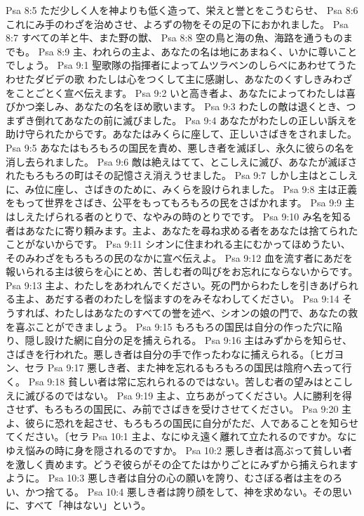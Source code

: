 Psa 8:5  ただ少しく人を神よりも低く造って、栄えと誉とをこうむらせ、
Psa 8:6  これにみ手のわざを治めさせ、よろずの物をその足の下におかれました。
Psa 8:7  すべての羊と牛、また野の獣、
Psa 8:8  空の鳥と海の魚、海路を通うものまでも。
Psa 8:9  主、われらの主よ、あなたの名は地にあまねく、いかに尊いことでしょう。
Psa 9:1  聖歌隊の指揮者によってムツラベンのしらべにあわせてうたわせたダビデの歌 わたしは心をつくして主に感謝し、あなたのくすしきみわざをことごとく宣べ伝えます。
Psa 9:2  いと高き者よ、あなたによってわたしは喜びかつ楽しみ、あなたの名をほめ歌います。
Psa 9:3  わたしの敵は退くとき、つまずき倒れてあなたの前に滅びました。
Psa 9:4  あなたがわたしの正しい訴えを助け守られたからです。あなたはみくらに座して、正しいさばきをされました。
Psa 9:5  あなたはもろもろの国民を責め、悪しき者を滅ぼし、永久に彼らの名を消し去られました。
Psa 9:6  敵は絶えはてて、とこしえに滅び、あなたが滅ぼされたもろもろの町はその記憶さえ消えうせました。
Psa 9:7  しかし主はとこしえに、み位に座し、さばきのために、みくらを設けられました。
Psa 9:8  主は正義をもって世界をさばき、公平をもってもろもろの民をさばかれます。
Psa 9:9  主はしえたげられる者のとりで、なやみの時のとりでです。
Psa 9:10  み名を知る者はあなたに寄り頼みます。主よ、あなたを尋ね求める者をあなたは捨てられたことがないからです。
Psa 9:11  シオンに住まわれる主にむかってほめうたい、そのみわざをもろもろの民のなかに宣べ伝えよ。
Psa 9:12  血を流す者にあだを報いられる主は彼らを心にとめ、苦しむ者の叫びをお忘れにならないからです。
Psa 9:13  主よ、わたしをあわれんでください。死の門からわたしを引きあげられる主よ、あだする者のわたしを悩ますのをみそなわしてください。
Psa 9:14  そうすれば、わたしはあなたのすべての誉を述べ、シオンの娘の門で、あなたの救を喜ぶことができましょう。
Psa 9:15  もろもろの国民は自分の作った穴に陥り、隠し設けた網に自分の足を捕えられる。
Psa 9:16  主はみずからを知らせ、さばきを行われた。悪しき者は自分の手で作ったわなに捕えられる。〔ヒガヨン、セラ
Psa 9:17  悪しき者、また神を忘れるもろもろの国民は陰府へ去って行く。
Psa 9:18  貧しい者は常に忘れられるのではない。苦しむ者の望みはとこしえに滅びるのではない。
Psa 9:19  主よ、立ちあがってください。人に勝利を得させず、もろもろの国民に、み前でさばきを受けさせてください。
Psa 9:20  主よ、彼らに恐れを起させ、もろもろの国民に自分がただ、人であることを知らせてください。〔セラ
Psa 10:1  主よ、なにゆえ遠く離れて立たれるのですか。なにゆえ悩みの時に身を隠されるのですか。
Psa 10:2  悪しき者は高ぶって貧しい者を激しく責めます。どうぞ彼らがその企てたはかりごとにみずから捕えられますように。
Psa 10:3  悪しき者は自分の心の願いを誇り、むさぼる者は主をのろい、かつ捨てる。
Psa 10:4  悪しき者は誇り顔をして、神を求めない。その思いに、すべて「神はない」という。
